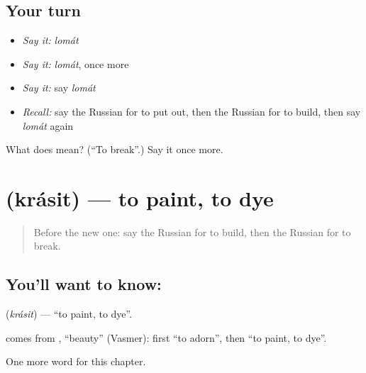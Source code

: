 \subsection*{Your turn}
\begin{itemize}
\raggedright
  \item \emph{Say it:} \emph{lomát}
  \item \emph{Say it:} \emph{lomát}, once more
  \item \emph{Say it:} say \emph{lomát}
  \item \emph{Recall:} say the Russian for to put out, then the Russian for to build, then say \emph{lomát} again
\end{itemize}

\begin{tcolorbox}[breakable,colback=teal!4,colframe=teal!35!black,title={Before you move on}]
What does  mean? (\textquotedblleft{}To break\textquotedblright{}.) Say it once more.
\end{tcolorbox}
\section[\texorpdfstring{\ru{красить} (krásit)}{красить (krásit)}]{ (krásit) — to paint, to dye}

\label{lesson:RU-C206-krasit}



\begin{quote}
Before the new one: say the Russian for to build, then the Russian for to break.
\end{quote}

\subsection*{You'll want to know: }
\textbf{} (\emph{krásit}) — \textquotedblleft{}to paint, to dye\textquotedblright{}.

\begin{cousinweb}
\textbf{} comes from \emph{}, \textquotedblleft{}beauty\textquotedblright{} (Vasmer): first \textquotedblleft{}to adorn\textquotedblright{}, then \textquotedblleft{}to paint, to dye\textquotedblright{}.
\end{cousinweb}

\begin{grammarlens}[title={What you've built}]
One more word for this chapter.
\end{grammarlens}

